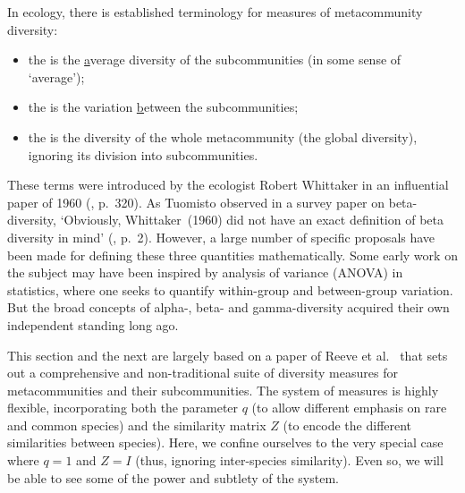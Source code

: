 In ecology, there is established terminology for measures of metacommunity
diversity:
% 
\begin{itemize}
\item 
the  is the \underline{a}verage
diversity of the subcommunities (in some sense of `average');

\item
the  is the variation \underline{b}etween
the subcommunities;%
%
%

\item
the  is the diversity of the whole metacommunity (the
\underline{g}lobal diversity), ignoring its division into subcommunities.
\end{itemize}
% 
These terms were introduced by the ecologist Robert
Whittaker%
%
%
in an influential paper of 1960 (\cite{WhitVSM}, p.~320).  As Tuomisto%
%
%
observed in a survey paper on beta-diversity, `Obviously, Whittaker~(1960)
did not have an exact definition of beta diversity in mind' (\cite{Tuom1},
p.~2).  However, a large number of specific proposals have been made for
defining these three quantities mathematically.  Some early work on the
subject may have been inspired by analysis%
%
%
of variance (ANOVA) in statistics, where one seeks to quantify
within-group and between-group variation.  But the broad concepts
of alpha-, beta- and gamma-diversity acquired their own independent
standing long ago.

This section and the next are largely based on a paper of Reeve
et al.~\cite{HPD} that sets
out a comprehensive and non-traditional suite of diversity measures for
metacommunities and their subcommunities.  The system of measures is highly
flexible, incorporating both the parameter $q$ (to allow different
emphasis on rare and common species) and the similarity matrix $Z$ (to
encode the different similarities between species).
% 
Here, we confine ourselves to the very special case where $q = 1$ and
$Z = I$ (thus, ignoring inter-species similarity).  Even so, we will be
able to see some of the power and subtlety of the system.  

